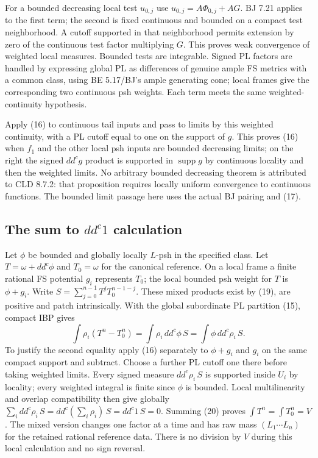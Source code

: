 \documentclass[
  11pt,
]{article}
\begin{document}
For a bounded decreasing local test \(u_{0,j}\) use
\(u_{0,j}=A\Phi_{0,j}+AG\). BJ 7.21 applies to the first term; the
second is fixed continuous and bounded on a compact test neighborhood. A
cutoff supported in that neighborhood permits extension by zero of the
continuous test factor multiplying \(G\). This proves weak convergence
of weighted local measures. Bounded tests are integrable. Signed PL
factors are handled by expressing global PL as differences of genuine
ample FS metrics with a common class, using BE 5.17/BJ's ample
generating cone; local frames give the corresponding two continuous psh
weights. Each term meets the same weighted-continuity hypothesis.

Apply (16) to continuous tail inputs and pass to limits by this weighted
continuity, with a PL cutoff equal to one on the support of \(g\). This
proves (16) when \(f_1\) and the other local psh inputs are bounded
decreasing limits; on the right the signed \(dd^cg\) product is
supported in \(\operatorname{supp}g\) by continuous locality and then
the weighted limits. No arbitrary bounded decreasing theorem is
attributed to CLD 8.7.2: that proposition requires locally uniform
convergence to continuous functions. The bounded limit passage here uses
the actual BJ pairing and (17).

\subsection{\texorpdfstring{The sum to \(dd^c1\)
calculation}{The sum to dd\^{}c1 calculation}}\label{the-sum-to-ddc1-calculation}

Let \(\phi\) be bounded and globally locally \(L\)-psh in the specified
class. Let \(T=\omega+dd^c\phi\) and \(T_0=\omega\) for the canonical
reference. On a local frame a finite rational FS potential \(g_i\)
represents \(T_0\); the local bounded psh weight for \(T\) is
\(\phi+g_i\). Write \(S=\sum_{j=0}^{n-1}T^jT_0^{n-1-j}\). These mixed
products exist by (19), are positive and patch intrinsically. With the
global subordinate PL partition (15), compact IBP gives \[
 \int\rho_i(T^n-T_0^n)
 =\int\rho_i\,dd^c\phi\,S
 =\int\phi\,dd^c\rho_i\,S. \tag{20}
\] To justify the second equality apply (16) separately to \(\phi+g_i\)
and \(g_i\) on the same compact support and subtract. Choose a further
PL cutoff one there before taking weighted limits. Every signed measure
\(dd^c\rho_i\,S\) is supported inside \(U_i\) by locality; every
weighted integral is finite since \(\phi\) is bounded. Local
multilinearity and overlap compatibility then give globally
\(\sum_i dd^c\rho_i\,S=dd^c(\sum_i\rho_i)\,S=dd^c1\,S=0\). Summing (20)
proves \(\int T^n=\int T_0^n=V\). The mixed version changes one factor
at a time and has raw mass \((L_1\cdots L_n)\) for the retained rational
reference data. There is no division by \(V\) during this local
calculation and no sign reversal.
\end{document}
